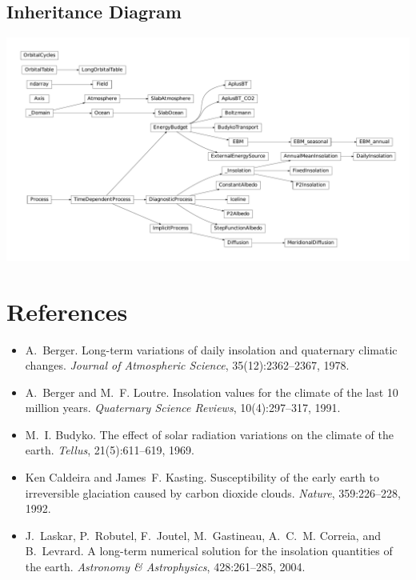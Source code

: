 \documentclass[a4paper,10pt,english]{sphinxmanual}
\begin{document}
\section{Inheritance Diagram}
\label{api/climlab:inheritance-diagram}
\includegraphics{inheritance-146680b39325a875f0dcfe7f223bdb8225716a47.pdf}


\chapter{References}
\label{references:references}\label{references::doc}\begin{itemize}
\item {} 
A. Berger. Long-term variations of daily insolation and quaternary climatic changes. \emph{Journal of Atmospheric Science}, 35(12):2362–2367, 1978.

\item {} 
A. Berger and M. F. Loutre. Insolation values for the climate of the last 10 million years. \emph{Quaternary Science Reviews}, 10(4):297–317, 1991.

\item {} 
M. I. Budyko. The effect of solar radiation variations on the climate of the earth. \emph{Tellus}, 21(5):611–619, 1969.

\item {} 
Ken Caldeira and James F. Kasting. Susceptibility of the early earth to irreversible glaciation caused by carbon dioxide clouds. \emph{Nature}, 359:226–228, 1992.

\item {} 
J. Laskar, P. Robutel, F. Joutel, M. Gastineau, A. C. M. Correia, and B. Levrard. A long-term numerical solution for the insolation quantities of the earth. \emph{Astronomy \& Astrophysics}, 428:261–285, 2004.

\end{itemize}
\end{document}
